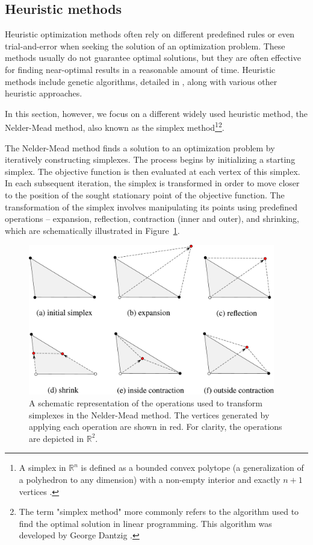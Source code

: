 \subsection{Heuristic methods}\label{heuristic}
Heuristic optimization methods often rely on different predefined rules or even trial-and-error when seeking the solution of an optimization problem. These methods usually do not guarantee optimal solutions, but they are often effective for finding near-optimal results in a reasonable amount of time. Heuristic methods include genetic algorithms, detailed in \cite{BBO-textbook}, along with various other heuristic approaches.

In this section, however, we focus on a different widely used heuristic method, the Nelder-Mead method, also known as the simplex method\footnote{A simplex in $ \mathbb{R}^n $ is defined as a bounded convex polytope (a generalization of a polyhedron to any dimension) with a non-empty interior and exactly $ n+1 $ vertices \cite{BBO-textbook}.}\footnote{The term "simplex method" more commonly refers to the algorithm used to find the optimal solution in linear programming. This algorithm was developed by George Dantzig \cite{Dantzig1990}.}\cite{Nelder1965}.

The Nelder-Mead method finds a solution to an optimization problem by iteratively constructing simplexes. The process begins by initializing a starting simplex. The objective function is then evaluated at each vertex of this simplex. In each subsequent iteration, the simplex is transformed in order to move closer to the position of the sought stationary point of the objective function. The transformation of the simplex involves manipulating its points using predefined operations -- expansion, reflection, contraction (inner and outer), and shrinking, which are schematically illustrated in Figure~\ref{fig:NM operations}. 

\begin{figure}[H]
	\centering
	\includegraphics[width=0.96\textwidth]{figures/neldermead.pdf}
	\vspace{2mm}
	\caption{A schematic representation of the operations used to transform simplexes in the Nelder-Mead method. The vertices generated by applying each operation are shown in red. For clarity, the operations are depicted in $ \mathbb{R}^2 $.}
	\label{fig:NM operations}
\end{figure}

